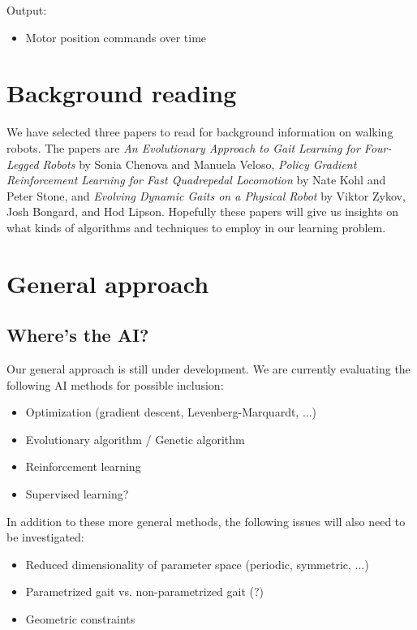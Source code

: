  
\noindent Output:

\begin{itemize}
\item Motor position commands over time
\end{itemize}


\section{Background reading}

We have selected three papers to read for background information on
walking robots. The papers are \emph{An Evolutionary Approach to Gait
  Learning for Four-Legged Robots} by Sonia Chenova and Manuela
Veloso, \emph{Policy Gradient Reinforcement Learning for Fast
  Quadrepedal Locomotion} by Nate Kohl and Peter Stone, and
\emph{Evolving Dynamic Gaits on a Physical Robot} by Viktor Zykov,
Josh Bongard, and Hod Lipson. Hopefully these papers will give us
insights on what kinds of algorithms and techniques to employ in our
learning problem.




\section{General approach}
\label{sec:approach}

\subsection{Where's the AI?}

Our general approach is still under development.  We are currently
evaluating the following AI methods for possible inclusion:

\begin{itemize}
\item Optimization (gradient descent, Levenberg-Marquardt, ...)
\item Evolutionary algorithm / Genetic algorithm
\item Reinforcement learning
\item Supervised learning?
\end{itemize}

In addition to these more general methods, the following issues will
also need to be investigated:

\begin{itemize}
\item Reduced dimensionality of parameter space (periodic, symmetric, ...)
\item Parametrized gait vs. non-parametrized gait (?)
\item Geometric constraints
\end{itemize}



